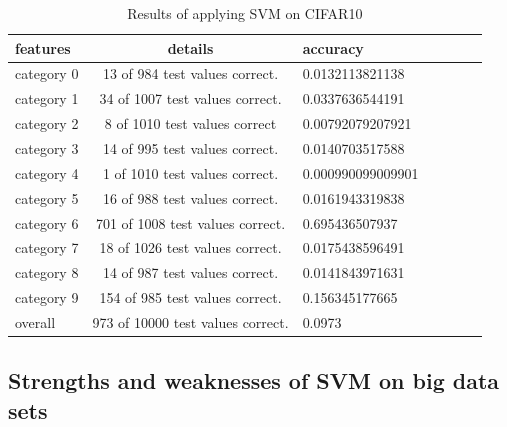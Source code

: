 \documentclass{article}
\theoremstyle{definition}
\numberwithin{equation}{section}
\numberwithin{figure}{section}
\begin{document}
 \begin{table}[htbp]
 \centering
 \caption{Results of applying SVM on CIFAR10}
 \label{bonus}
 \begin{tabular}{lclclcl}
 \hline
  features& details &	accuracy	   \\ \hline
  category 0 & 13 of 984 test values correct. & 0.0132113821138\\

  category 1 & 34 of 1007 test values correct. & 0.0337636544191\\

  category 2  & 8 of 1010 test values correct & 0.00792079207921\\

  category 3 & 14 of 995 test values correct. & 0.0140703517588\\

  category 4 & 1 of 1010 test values correct. & 0.000990099009901\\

  category 5 & 16 of 988 test values correct.  & 0.0161943319838\\

  category 6 & 701 of 1008 test values correct. & 0.695436507937\\

  category 7 & 18 of 1026 test values correct. & 0.0175438596491\\

  category 8 & 14 of 987 test values correct.& 0.0141843971631\\

  category 9 & 154 of 985 test values correct. & 0.156345177665\\
overall & 973 of 10000 test values correct. &  0.0973
  
 \end{tabular}
 \end{table}
 
 \subsection{Strengths and weaknesses of SVM on big data sets}
\end{document}
